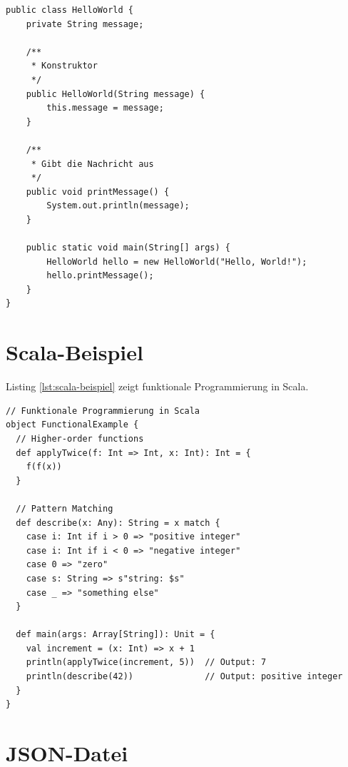 \begin{listing}[htbp]
\begin{verbatim}
public class HelloWorld {
    private String message;
    
    /**
     * Konstruktor
     */
    public HelloWorld(String message) {
        this.message = message;
    }
    
    /**
     * Gibt die Nachricht aus
     */
    public void printMessage() {
        System.out.println(message);
    }
    
    public static void main(String[] args) {
        HelloWorld hello = new HelloWorld("Hello, World!");
        hello.printMessage();
    }
}
\end{verbatim}
\caption{Java Hello World mit Klassen}
\label{lst:java-beispiel}
\end{listing}

\section{Scala-Beispiel}
\label{sec:scala-code}

Listing \ref{lst:scala-beispiel} zeigt funktionale Programmierung in Scala.

\begin{listing}[htbp]
\begin{verbatim}
// Funktionale Programmierung in Scala
object FunctionalExample {
  // Higher-order functions
  def applyTwice(f: Int => Int, x: Int): Int = {
    f(f(x))
  }
  
  // Pattern Matching
  def describe(x: Any): String = x match {
    case i: Int if i > 0 => "positive integer"
    case i: Int if i < 0 => "negative integer"
    case 0 => "zero"
    case s: String => s"string: $s"
    case _ => "something else"
  }
  
  def main(args: Array[String]): Unit = {
    val increment = (x: Int) => x + 1
    println(applyTwice(increment, 5))  // Output: 7
    println(describe(42))              // Output: positive integer
  }
}
\end{verbatim}
\caption{Scala Beispiel mit funktionaler Programmierung}
\label{lst:scala-beispiel}
\end{listing}

\section{JSON-Datei}
\label{sec:json-code}

